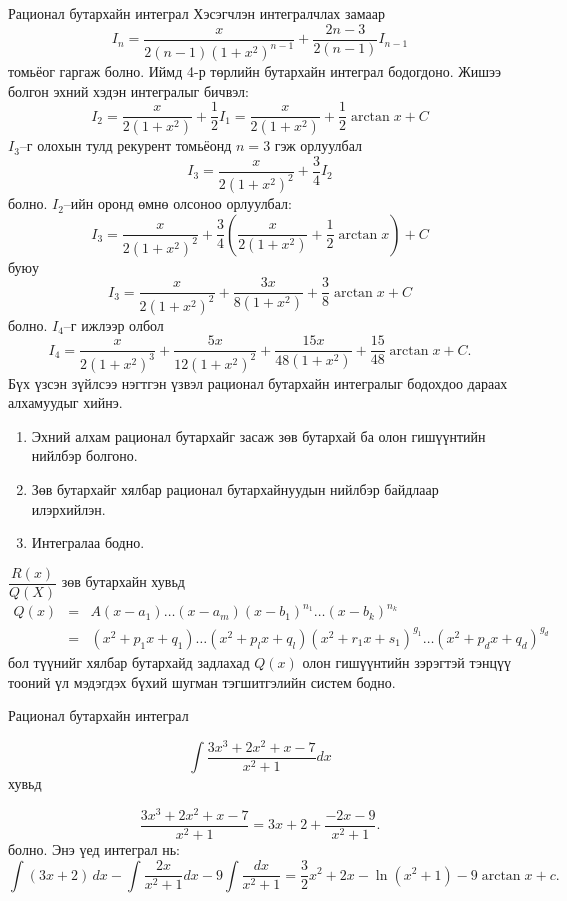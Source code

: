 \begin{frame}[allowframebreaks]{Рационал бутархайн интеграл}
Хэсэгчлэн интегралчлах замаар
\[
I_n = \frac{x}{2(n-1)(1+x^2)^{n-1}} + \frac{2n-3}{2(n-1)} I_{n-1}
\]
томьёог гаргаж болно. Иймд 4-р төрлийн бутархайн интеграл бодогдоно. Жишээ болгон эхний хэдэн интегралыг бичвэл:
\[
I_2=\frac{x}{2(1+x^2)}+\frac12 I_1
   =\frac{x}{2(1+x^2)}+\frac12\arctan x+C
\]
$I_3$–г олохын тулд рекурент томьёонд $n=3$ гэж орлуулбал
\[
I_3=\frac{x}{2(1+x^2)^2}+\frac34 I_2
\] болно.
$I_2$–ийн оронд өмнө олсоноо орлуулбал:
\[
I_3=\frac{x}{2(1+x^2)^2}
    +\frac{3}{4}\left(\frac{x}{2(1+x^2)}+\frac12\arctan x\right)+C
\]
буюу
\[
I_3=
\frac{x}{2(1+x^2)^2}
+\frac{3x}{8(1+x^2)}
+\frac{3}{8}\arctan x+C
\]
болно.
$I_4$–г ижлээр олбол
\[
I_4=
\frac{x}{2(1+x^2)^3}
+\frac{5x}{12(1+x^2)^2}
+\frac{15x}{48(1+x^2)}
+\frac{15}{48}\arctan x+C.
\]
Бүх үзсэн зүйлсээ нэгтгэн үзвэл рационал бутархайн интегралыг бодохдоо дараах алхамуудыг хийнэ. 
\begin{enumerate}
    \item Эхний алхам рационал бутархайг засаж зөв бутархай ба олон гишүүнтийн нийлбэр болгоно.
    \item Зөв бутархайг хялбар рационал бутархайнуудын нийлбэр байдлаар илэрхийлэн.
    \item Интегралаа бодно.
\end{enumerate}
$\dfrac{R(x)}{Q(X)}$ зөв бутархайн хувьд
\begin{eqnarray}
Q(x)&=&A(x-a_1)\ldots (x-a_m)(x-b_1)^{n_1}\ldots (x-b_k)^{n_k}\nonumber\\
   &=& (x^2+p_1x+q_1)\ldots (x^2+p_lx+q_l)(x^2+r_1x+s_1)^{g_1}\ldots (x^2+p_dx+q_d)^{g_d}\nonumber
\end{eqnarray} бол түүнийг хялбар бутархайд задлахад $Q(x)$ олон гишүүнтийн зэрэгтэй тэнцүү тооний үл мэдэгдэх бүхий шугман тэгшитгэлийн систем бодно.
\end{frame}

\begin{frame}[allowframebreaks]{Рационал бутархайн интеграл}
\begin{example}
$$
\int\frac{3x^3+2x^2+x-7}{x^2+1} dx$$ хувьд

 \[
\frac{3x^3+2x^2+x-7}{x^2+1}
=
3x+2+\frac{-2x-9}{x^2+1}.
\]
болно. 
Энэ үед интеграл нь:
\[
\int (3x+2)\,dx - \int\frac{2x}{x^2+1}dx - 9\int\frac{dx}{x^2+1}=\dfrac{3}{2}x^2+2x-\ln(x^2+1)-9\arctan x+c.
\]   
\end{example} 
\end{frame}

